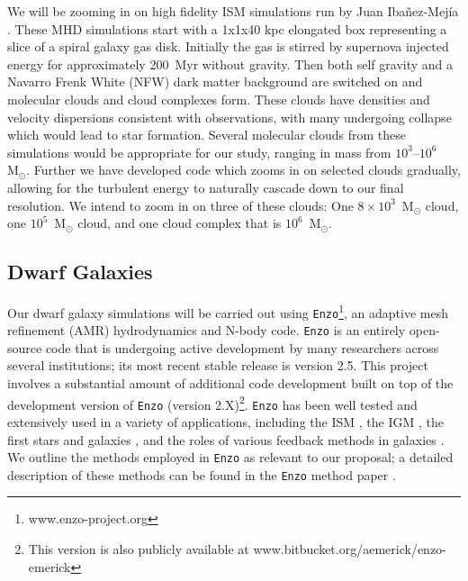 \documentclass[11pt]{article}
\newcommand{\eg}{e.g.,}
\newcommand{\msun}{$\textrm{M}_{\odot}$}
\begin{document}
We will be zooming in on high fidelity ISM simulations run by Juan Iba\~{n}ez-Mej\'{i}a \citep{Ibanez-Mejia2016}. These MHD simulations start with a 1x1x40 \si{kpc} elongated box representing a slice of a spiral galaxy gas disk. Initially the gas is stirred by supernova injected energy for approximately 200~Myr without gravity. Then both self gravity and a Navarro Frenk White (NFW) dark matter background are switched on and molecular clouds and cloud complexes form. These clouds have densities and velocity dispersions consistent with observations, with many undergoing collapse which would lead to star formation. Several molecular clouds from these simulations would be appropriate for our study, ranging in mass from %
$10^3$--$10^6$~\msun.  Further we have developed code which zooms in on selected clouds gradually, allowing for the turbulent energy to naturally cascade down to our final resolution. We intend to zoom in on three of these clouds: One $8 \times 10^3$~{\msun} cloud, one $10^5$~{\msun} cloud, and one cloud complex that is $10^6$~{\msun}. %


\subsection{Dwarf Galaxies}
Our dwarf galaxy simulations will be carried out using \texttt{Enzo}\footnote{www.enzo-project.org}, an adaptive mesh refinement (AMR) hydrodynamics and N-body code. \texttt{Enzo} is an entirely open-source code that is undergoing active development by many researchers across several institutions; its most recent stable release is version 2.5. This project involves a substantial amount of additional code development built on top of the development version of \texttt{Enzo} (version 2.X)\footnote{This version is also publicly available at www.bitbucket.org/aemerick/enzo-emerick}. \texttt{Enzo} has been well tested and extensively used in a variety of applications, including the ISM \citep{2005MNRAS.356..737S, 2008ApJ...673..810T}, the IGM \citep{2000ApJ...534...57B, 2001ApJ...561L..31F}, the first stars and galaxies \citep[\eg][]{Wise2012a, WiseAbel2012, Wise2014}, and the roles of various feedback methods in galaxies \citep[\eg][]{Simpson2015, SalemBryan2014, Goldbaum2016, Forbes2016}. We outline the methods employed in \texttt{Enzo} as relevant to our proposal; a detailed description of these methods can be found in the \texttt{Enzo} method paper \citep{Enzo2014}. 
\end{document}
